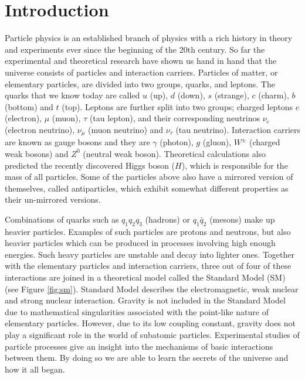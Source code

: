 \pagestyle{plain}
\chapter{Introduction}
Particle physics is an established branch of physics with a rich history in theory and experiments ever since the beginning of the 20th century. So far the experimental and theoretical research have shown us hand in hand that the universe consists of particles and interaction carriers. Particles of matter, or elementary particles, are divided into two groups, quarks, and leptons. The quarks that we know today are called $u$ (up), $d$ (down), $s$ (strange), $c$ (charm), $b$ (bottom) and $t$ (top). Leptons are  further split into two groups; charged leptons $e$ (electron), $\mu$ (muon), $\tau$ (tau lepton), and their corresponding neutrinos $\nu_e$ (electron neutrino), $\nu_\mu$ (muon neutrino) and $\nu_\tau$ (tau neutrino). Interaction carriers are known as gauge bosons and they are $\gamma$ (photon), $g$ (gluon), $W^\pm$ (charged weak bosons) and $Z^0$ (neutral weak boson). Theoretical calculations also predicted the recently discovered Higgs boson ($H$), which is responsible for the mass of all particles. Some of the particles above also have a mirrored version of themselves, called antiparticles, which exhibit somewhat different properties as their un-mirrored versions.

Combinations of quarks such as $q_1 q_2 q_3$ (hadrons) or $q_1 \bar{q}_2$ (mesons) make up heavier particles. Examples of such particles are protons and neutrons, but also heavier particles which can be produced in processes involving high enough energies. Such heavy particles are unstable and decay into lighter ones. Together with the elementary particles and interaction carriers, three out of four of these interactions are joined in a theoretical model called the Standard Model (SM) \cite{GLASHOW1961579, PhysRevLett.19.1264, salam1994weak, GIMmech} (see Figure \ref{fig:sm}). Standard Model describes the electromagnetic, weak nuclear and strong nuclear interaction. Gravity is not included in the Standard Model due to mathematical singularities associated with the point-like nature of elementary particles. However, due to its low coupling constant, gravity does not play a significant role in the world of subatomic particles. Experimental studies of particle processes give an insight into the mechanisms of basic interactions between them. By doing so we are able to learn the secrets of the universe and how it all began.


